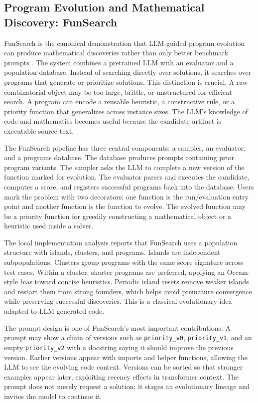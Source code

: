 \subsection{Program Evolution and Mathematical Discovery: FunSearch}
\label{subsec:funsearch}

FunSearch is the canonical demonstration that LLM-guided program evolution can produce mathematical discoveries rather than only better benchmark prompts \cite{funsearch2024}.  The system combines a pretrained LLM with an evaluator and a population database.  Instead of searching directly over solutions, it searches over programs that generate or prioritize solutions.  This distinction is crucial.  A raw combinatorial object may be too large, brittle, or unstructured for efficient search.  A program can encode a reusable heuristic, a constructive rule, or a priority function that generalizes across instance sizes.  The LLM's knowledge of code and mathematics becomes useful because the candidate artifact is executable source text.

The FunSearch pipeline has three central components: a sampler, an evaluator, and a programs database.  The database produces prompts containing prior program variants.  The sampler asks the LLM to complete a new version of the function marked for evolution.  The evaluator parses and executes the candidate, computes a score, and registers successful programs back into the database.  Users mark the problem with two decorators: one function is the run/evaluation entry point and another function is the function to evolve.  The evolved function may be a priority function for greedily constructing a mathematical object or a heuristic used inside a solver.

The local implementation analysis reports that FunSearch uses a population structure with islands, clusters, and programs.  Islands are independent subpopulations.  Clusters group programs with the same score signature across test cases.  Within a cluster, shorter programs are preferred, applying an Occam-style bias toward concise heuristics.  Periodic island resets remove weaker islands and restart them from strong founders, which helps avoid premature convergence while preserving successful discoveries.  This is a classical evolutionary idea adapted to LLM-generated code.

The prompt design is one of FunSearch's most important contributions.  A prompt may show a chain of versions such as \texttt{priority\_v0}, \texttt{priority\_v1}, and an empty \texttt{priority\_v2} with a docstring saying it should improve the previous version.  Earlier versions appear with imports and helper functions, allowing the LLM to see the evolving code context.  Versions can be sorted so that stronger examples appear later, exploiting recency effects in transformer context.  The prompt does not merely request a solution; it stages an evolutionary lineage and invites the model to continue it.

